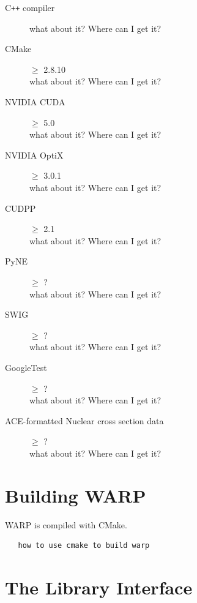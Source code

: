 \documentclass[twoside,a4paper]{refart}
\begin{document}
\begin{description}

\item[C\texttt{++} compiler]
	what about it?  Where can I get it?


\item[CMake]$\ge$ 2.8.10 \\
	what about it?  Where can I get it?

        
\item[NVIDIA CUDA]$\ge$ 5.0 \\
	what about it?  Where can I get it?

\item[NVIDIA OptiX]$\ge$ 3.0.1 \\
	what about it?  Where can I get it?

\item[CUDPP]$\ge$ 2.1 \\
	what about it?  Where can I get it?

\item[PyNE]$\ge$ ? \\
	what about it?  Where can I get it?

\item[SWIG]$\ge$ ? \\
	what about it?  Where can I get it?

\item[GoogleTest]$\ge$ ? \\
	what about it?  Where can I get it?

\item[ACE-formatted Nuclear cross section data]$\ge$ ? \\
	what about it?  Where can I get it?
        
\end{description}

\section{Building WARP}

WARP is compiled with CMake.

\begin{verbatim}
   how to use cmake to build warp
\end{verbatim}


\section{The Library Interface}
\end{document}
